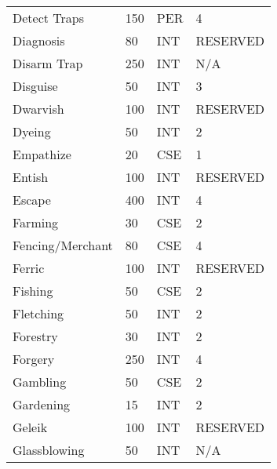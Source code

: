 \begin{normbox}
\begin{tabularx}{\linewidth}{@{} l X X X }
Detect Traps & 150 & PER & 4 \\
Diagnosis & 80 & INT & RESERVED \\
Disarm Trap & 250 & INT & N/A \\
Disguise & 50 & INT & 3 \\
Dwarvish & 100 & INT & RESERVED \\
Dyeing & 50 & INT & 2 \\
Empathize & 20 & CSE & 1 \\
Entish & 100 & INT & RESERVED \\
Escape & 400 & INT & 4 \\
Farming & 30 & CSE & 2 \\
Fencing/Merchant & 80 & CSE & 4 \\
Ferric & 100 & INT & RESERVED \\
Fishing & 50 & CSE & 2 \\
Fletching & 50 & INT & 2 \\
Forestry & 30 & INT & 2 \\
Forgery & 250 & INT & 4 \\
Gambling & 50 & CSE & 2 \\
Gardening & 15 & INT & 2 \\
Geleik & 100 & INT & RESERVED \\
Glassblowing & 50 & INT & N/A \\
\end{tabularx}
\end{normbox}
